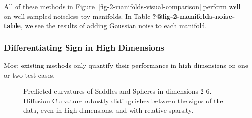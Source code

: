 \documentclass[
  letterpaper,
  DIV=11,
  numbers=noendperiod]{scrartcl}
\theoremstyle{plain}
\theoremstyle{plain}
\theoremstyle{definition}
\theoremstyle{plain}
\theoremstyle{definition}
\theoremstyle{remark}
\begin{document}
All of these methods in Figure~\ref{fig-2-manifolds-visual-comparison}
perform well on well-sampled noiseless toy manifolds. In Table
\textbf{?@fig-2-manifolds-noise-table}, we see the results of adding
Gaussian noise to each manifold.

\subsubsection{Differentiating Sign in High
Dimensions}\label{differentiating-sign-in-high-dimensions}

Most existing methods only quantify their performance in high dimensions
on one or two test cases.

\begin{figure}[H]


\caption{\label{fig-sadspheres}Predicted curvatures of Saddles and
Spheres in dimensions 2-6. Diffusion Curvature robustly distinguishes
between the signs of the data, even in high dimensions, and with
relative sparsity.}

\end{figure}%
\end{document}
